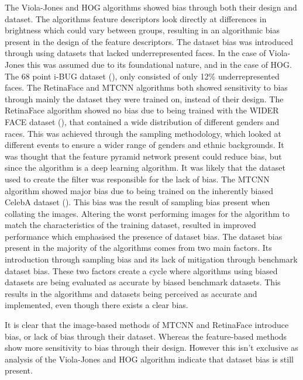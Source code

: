 \documentclass{l4proj}
\begin{document}
The Viola-Jones and HOG algorithms showed bias through both their design and dataset. The algorithms feature descriptors look directly at differences in brightness which could vary between groups, resulting in an algorithmic bias present in the design of the feature descriptors. The dataset bias was introduced through using datasets that lacked underrepresented faces. In the case of Viola-Jones this was assumed due to its foundational nature, and in the case of HOG. The 68 point i-BUG dataset (\cite{300w}), only consisted of only 12\% underrepresented faces. The RetinaFace and MTCNN algorithms both showed sensitivity to bias through mainly the dataset they were trained on, instead of their design. The RetinaFace algorithm showed no bias due to being trained with the WIDER FACE dataset (\cite{widerface}), that contained a wide distribution of different genders and races. This was achieved through the sampling methodology, which looked at different events to ensure a wider range of genders and ethnic backgrounds. It was thought that the feature pyramid network present could reduce bias, but since the algorithm is a deep learning algorithm. It was likely that the dataset used to create the filter was responsible for the lack of bias. The MTCNN algorithm showed major bias due to being trained on the inherently biased CelebA dataset (\cite{celeba}). This bias was the result of sampling bias present when collating the images. Altering the worst performing images for the algorithm to match the characteristics of the training dataset, resulted in improved performance which emphasised the presence of dataset bias. The dataset bias present in the majority of the algorithms comes from two main factors. Its introduction through sampling bias and its lack of mitigation through benchmark dataset bias. These two factors create a cycle where algorithms using biased datasets are being evaluated as accurate by biased benchmark datasets. This results in the algorithms and datasets being perceived as accurate and implemented, even though there exists a clear bias.

It is clear that the image-based methods of MTCNN and RetinaFace introduce bias, or lack of bias through their dataset. Whereas the feature-based methods show more sensitivity to bias through their design. However this isn't exclusive as analysis of the Viola-Jones and HOG algorithm indicate that dataset bias is still present.
\end{document}
